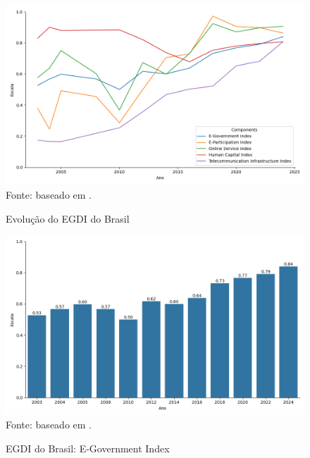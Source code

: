 \begin{figure}[H]
    \centering
    \caption{Evolução do EGDI do Brasil}
    \includegraphics[width=1\linewidth]{figuras/egdi/lineplot_egdi_brasil.png}
    \label{fig:lineplot_egdi_brasil}
    \footnotesize{Fonte: baseado em \cite{ONU_edgi_mapa}.}
\end{figure}


\begin{figure}[H]
    \centering
    \caption{EGDI do Brasil: E-Government Index}
    \includegraphics[width=1\linewidth]{figuras/egdi/egdi_brasil_egov.png}
    \label{fig:egdi_brasil_egov}
    \footnotesize{Fonte: baseado em \cite{ONU_edgi_mapa}.}
\end{figure}


